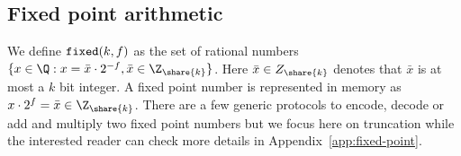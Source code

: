 \subsection{Fixed point arithmetic}
\label{subsec:fixed-point}

We define $\verb|fixed|(k, f)$ as the set of rational numbers $\{x \in \Q : x
= \bar{x} \cdot 2^{-f}, \bar{x} \in \Z_{\share{k}}\}$. Here $\bar{x} \in
Z_{\share{k}}$ denotes that $\bar{x}$ is at most a $k$ bit integer. A fixed
point number is represented in memory as $x \cdot 2^{f} = \bar{x} \in
\Z_{\share{k}}$. There are a few generic protocols to encode, decode or add
and multiply two fixed point numbers but we focus here on truncation while
the interested reader can check more details in
Appendix~\ref{app:fixed-point}.



